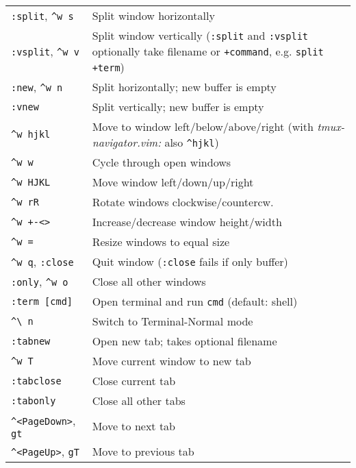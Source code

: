 \documentclass[a4paper, landscape, 10pt]{article}
\begin{document}
\begin{multicols*}{3}
    \begin{tabularx}{\columnwidth}{l>{\raggedright\arraybackslash}X}
\verb|:split|, \verb|^w s|
        &Split window horizontally\\
\verb|:vsplit|, \verb|^w v|
        &Split window vertically (\verb|:split| and \verb|:vsplit| optionally take filename or \verb|+command|, e.g. \verb|split +term|)\\
\verb|:new|, \verb|^w n|
        &Split horizontally; new buffer is empty\\
\verb|:vnew|
        &Split vertically; new buffer is empty\\
\verb|^w hjkl|
        &Move to window left/below/above/right \linebreak(with \textit{tmux-navigator.vim:} also \verb|^hjkl|)\\
\verb|^w w|
        &Cycle through open windows\\
\verb|^w HJKL|
        &Move window left/down/up/right\\
\verb|^w rR|
        &Rotate windows clockwise/countercw.\\
\verb|^w +-<>|
        &Increase/decrease window height/width\\
\verb|^w =|
        &Resize windows to equal size\\
\verb|^w q|, \verb|:close|
        &Quit window (\verb|:close| fails if only buffer)\\
\verb|:only|, \verb|^w o|
        &Close all other windows\\

\verb|:term [cmd]|
        &Open terminal and run \verb|cmd| (default: shell)\\
\verb|^\ n|
        &Switch to Terminal-Normal mode\\

\verb|:tabnew|
        &Open new tab; takes optional filename\\
\verb|^w T|
        &Move current window to new tab\\
\verb|:tabclose|
        &Close current tab\\
\verb|:tabonly|
        &Close all other tabs\\
\verb|^<PageDown>|, \verb|gt|
        &Move to next tab\\
\verb|^<PageUp>|, \verb|gT|
        &Move to previous tab
    \end{tabularx}




\end{multicols*}
\end{document}
